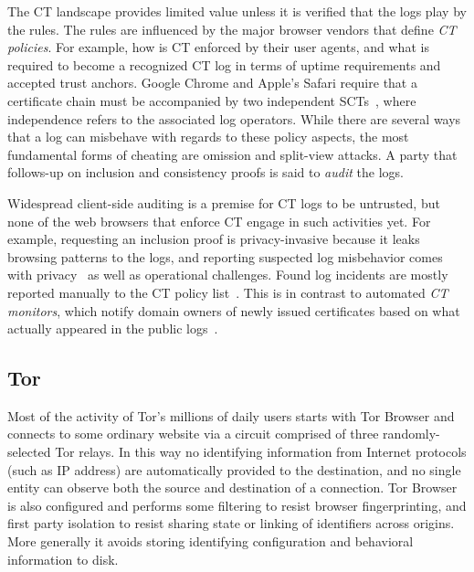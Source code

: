 The CT landscape provides limited value unless it is verified that the logs
play by the rules.  The rules are influenced by the major browser vendors that
define \emph{CT policies}.  For example, how is CT enforced by their user
agents, and what is required to become a recognized CT log in terms of uptime
requirements and accepted trust anchors.  Google Chrome and Apple's Safari
require that a certificate chain must be accompanied by two independent
SCTs~\cite{chrome-policy,safari-policy}, where independence refers to the
associated log operators.  While there are several ways that a log can misbehave
with regards to these policy aspects, the most fundamental forms of cheating are
omission and split-view attacks.  A party that follows-up on inclusion and
consistency proofs is said to \emph{audit} the logs.

Widespread client-side auditing is a premise for CT logs to be untrusted, but
none of the web browsers that enforce CT engage in such activities yet.  For
example, requesting an inclusion proof is privacy-invasive because it leaks
browsing patterns to the logs, and reporting suspected log misbehavior comes
with privacy~\cite{ct-with-privacy} as well as operational challenges.
Found log incidents are mostly reported manually to the CT policy
list~\cite{ct-policy-mailing-list}.  This is in contrast to automated
\emph{CT monitors}, which notify domain owners
of newly issued certificates based on what actually appeared in the public
logs~\cite{lwm,ct-monitors}.

\subsection{Tor} \label{sec:background:tor}

Most of the activity of Tor's millions of daily users starts with Tor Browser
and connects to some ordinary website via a circuit comprised of three
randomly-selected Tor relays. In this way no identifying information from
Internet protocols (such as IP address) are automatically provided to the
destination, and no single entity can observe both the source and destination of
a connection. Tor Browser is also configured and performs some filtering to resist
browser fingerprinting, and first party isolation to resist sharing state or
linking of identifiers across origins. More generally it avoids storing
identifying configuration and behavioral information to disk.

